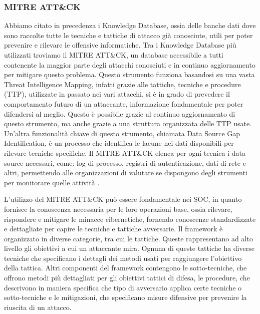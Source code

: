         \subsubsection{MITRE ATT\&CK}
            Abbiamo citato in precedenza i Knowledge  Database, ossia delle banche dati dove sono raccolte tutte le tecniche e tattiche di attacco già conosciute, utili per poter prevenire e rilevare le offensive informatiche.
            Tra i Knowledge  Database più utilizzati troviamo il MITRE ATT\&CK, un database accessibile a tutti contenente la maggior parte degli attacchi conosciuti e in continuo aggiornamento per mitigare questo problema. Questo strumento funziona basandosi su una vasta Threat Intelligence Mapping, infatti grazie alle tattiche, tecniche e procedure (TTP), utilizzate in passato nei vari attacchi, si è in grado di prevedere il comportamento futuro di un attaccante, informazione fondamentale per poter difendersi al meglio. Questo è possibile grazie al continuo aggiornamento di questo strumento, ma anche grazie a una struttura organizzata delle TTP usate. Un'altra funzionalità chiave di questo strumento, chiamata Data Source Gap Identification, è un processo che identifica le lacune nei dati disponibili per rilevare tecniche specifiche. Il MITRE ATT\&CK elenca per ogni tecnica i data source necessari, come: log di processo, registri di autenticazione, dati di rete e altri, permettendo alle organizzazioni di valutare se dispongono degli strumenti per monitorare quelle attività \cite{MITRE_ATT_CK_description}.
        
    
           L'utilizzo del MITRE ATT\&CK può essere fondamentale nei SOC, in quanto fornisce la conoscenza necessaria per le loro operazioni base, ossia rilevare, rispondere e mitigare le minacce cibernetiche, fornendo conoscenze standardizzate e dettagliate per capire le tecniche e tattiche avversarie. Il framework è organizzato in diverse categorie, tra cui le tattiche. Queste rappresentano ad alto livello gli obiettivi a cui un attaccante mira. Ognuna di queste tattiche ha diverse tecniche che specificano i dettagli dei metodi usati per raggiungere l'obiettivo della tattica. Altri componenti del framework contengono le sotto-tecniche, che offrono metodi più dettagliati per gli obiettivi tattici di difesa, le procedure, che descrivono in maniera specifica che tipo di avversario applica certe tecniche o sotto-tecniche e le mitigazioni, che specificano misure difensive per prevenire la riuscita di un attacco.

